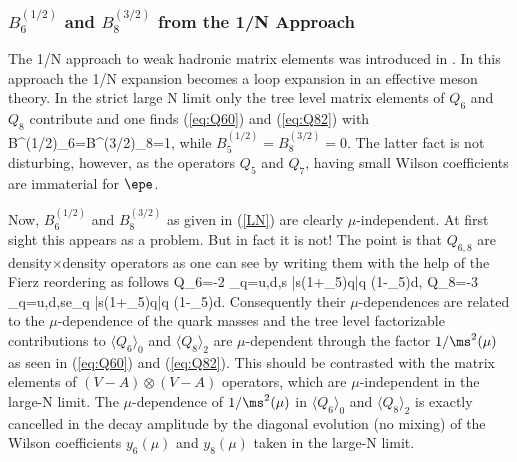 \subsubsection{$B^{(1/2)}_{6}$ and $B^{(3/2)}_{8}$ from the 1/N Approach}
The 1/N approach to weak hadronic matrix elements was introduced
in \cite{bardeen:87}. 
In this approach the 1/N expansion becomes a loop expansion
in an effective meson theory. In the strict large N limit only
the tree level matrix elements of $Q_6$ and $Q_8$ contribute
and one finds (\ref{eq:Q60}) and (\ref{eq:Q82}) with
\be\label{LN}
B^{(1/2)}_{6}=B^{(3/2)}_{8}=1, \quad{} 
\ee
while $B^{(1/2)}_{5}=B^{(3/2)}_{8}=0$. The latter fact is not disturbing,
however, as the operators $Q_5$ and $Q_7$, having small Wilson
coefficients are immaterial for $\epe$.

Now, $B^{(1/2)}_{6}$ and $B^{(3/2)}_{8}$ as given in (\ref{LN}) are
clearly $\mu$-independent. At first sight this appears as a problem.
But in fact it is not! The point is that $Q_{6,8}$ are
density$\times$density operators as one can see by writing them
with the help of the Fierz reordering as follows
\be\label{DENSITY}
Q_6=-2 \sum_{q=u,d,s} \bar s(1+\gamma_5)q\bar q (1-\gamma_5)d,
\quad\quad
Q_8=-3 \sum_{q=u,d,s}e_q \bar s(1+\gamma_5)q\bar q (1-\gamma_5)d.
\ee
Consequently their $\mu$-dependences are related to 
the $\mu$-dependence of the quark masses and the tree level 
factorizable contributions to
$\langle Q_6\rangle_0$ and $\langle Q_8\rangle_2$ are
$\mu$-dependent through the factor $1/\ms^2(\mu)$ as seen in
(\ref{eq:Q60}) and (\ref{eq:Q82}). This should be contrasted with
the matrix elements of $(V-A)\otimes(V-A)$ operators, which are
$\mu$-independent in the large-N limit. The $\mu$-dependence
of $1/\ms^2(\mu)$ in $\langle Q_6\rangle_0$ and $\langle Q_8\rangle_2$
is exactly cancelled in the decay amplitude by the diagonal
evolution (no mixing) of the Wilson coefficients $y_6(\mu)$ and
$y_8(\mu)$ taken in the large-N limit.

